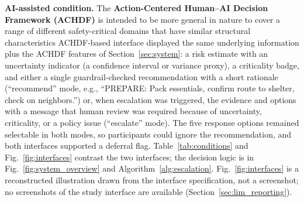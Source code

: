 \documentclass[journal]{IEEEtran}
\theoremstyle{plain}
\theoremstyle{definition}
\providecommand{\DIFaddtex}[1]{{\protect\color{blue} \sf #1}} %
\providecommand{\DIFdeltex}[1]{{\protect\color{red} \scriptsize #1}} %
\providecommand{\DIFaddbegin}{} %
\providecommand{\DIFaddend}{} %
\providecommand{\DIFdelbegin}{} %
\providecommand{\DIFdelend}{} %
\providecommand{\DIFadd}[1]{\texorpdfstring{\DIFaddtex{#1}}{#1}} %
\providecommand{\DIFdel}[1]{\texorpdfstring{\DIFdeltex{#1}}{}} %
\newcommand{\DIFscaledelfig}{0.5}
\newlength{\DIFdelgraphicswidth} %
\newlength{\DIFdelgraphicsheight} %
\newcommand{\DIFaddincludegraphics}[2][]{{\color{blue}\fbox{\DIFOincludegraphics[#1]{#2}}}} %
\newcommand{\DIFdelincludegraphics}[2][]{%
\sbox{\DIFdelgraphicsbox}{\DIFOincludegraphics[#1]{#2}}%
\settoboxwidth{\DIFdelgraphicswidth}{\DIFdelgraphicsbox} %
\settoboxtotalheight{\DIFdelgraphicsheight}{\DIFdelgraphicsbox} %
\scalebox{\DIFscaledelfig}{%
\parbox[b]{\DIFdelgraphicswidth}{\usebox{\DIFdelgraphicsbox}\\[-\baselineskip] \rule{\DIFdelgraphicswidth}{0em}}\llap{\resizebox{\DIFdelgraphicswidth}{\DIFdelgraphicsheight}{%
\setlength{\unitlength}{\DIFdelgraphicswidth}%
\begin{picture}(1,1)%
\thicklines\linethickness{2pt} %
{\color[rgb]{1,0,0}\put(0,0){\framebox(1,1){}}}%
{\color[rgb]{1,0,0}\put(0,0){\line( 1,1){1}}}%
{\color[rgb]{1,0,0}\put(0,1){\line(1,-1){1}}}%
\end{picture}%
}\hspace*{3pt}}} %
} %
\DeclareRobustCommand{\DIFaddbegin}{\DIFOaddbegin \let\includegraphics\DIFaddincludegraphics} %
\DeclareRobustCommand{\DIFaddend}{\DIFOaddend \let\includegraphics\DIFOincludegraphics} %
\DeclareRobustCommand{\DIFdelbegin}{\DIFOdelbegin \let\includegraphics\DIFdelincludegraphics} %
\DeclareRobustCommand{\DIFdelend}{\DIFOaddend \let\includegraphics\DIFOincludegraphics} %
\begin{document}
    \DIFadd{\textbf{AI-assisted condition.} }\DIFaddend The \DIFdelbegin \DIFdel{\textbf{Action-Centered Human--AI Decision Framework (ACHDF)} is intended to be more general in nature to cover a range of different safety-critical domains that have similar structural characteristics}\DIFdelend \DIFaddbegin \DIFadd{ACHDF-based interface displayed the same underlying information plus the ACHDF features of Section~\ref{sec:system}: a risk estimate with an uncertainty indicator (a confidence interval or variance proxy), a criticality badge, and either a single guardrail-checked recommendation with a short rationale (``recommend'' mode, e.g., ``PREPARE: Pack essentials, confirm route to shelter, check on neighbors.'') or, when escalation was triggered, the evidence and options with a message that human review was required because of uncertainty, criticality, or a policy issue (``escalate'' mode). The five response options remained selectable in both modes, so participants could ignore the recommendation, and both interfaces supported a deferral flag. Table~\ref{tab:conditions} and Fig.~\ref{fig:interfaces} contrast the two interfaces; the decision logic is in Fig.~\ref{fig:system_overview} and Algorithm~\ref{alg:escalation}. Fig.~\ref{fig:interfaces} is a reconstructed illustration drawn from the interface specification, not a screenshot; no screenshots of the study interface are available (Section~\ref{sec:lim_reporting})}\DIFaddend .
\end{document}
